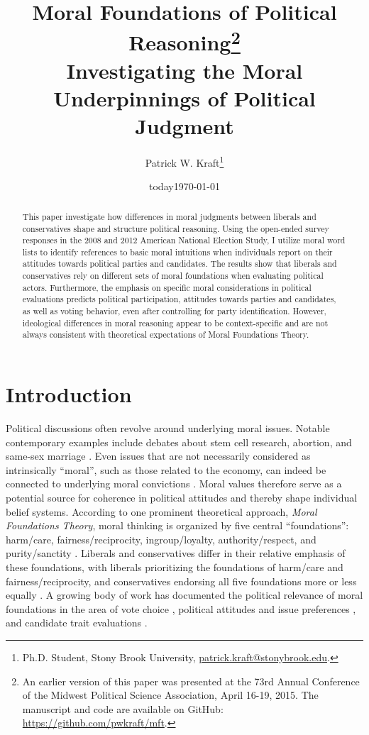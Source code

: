 \documentclass[12pt]{article}
\author{Patrick W. Kraft\footnote{Ph.D. Student, Stony Brook University, \href{mailto:patrick.kraft@stonybrook.edu}{patrick.kraft@stonybrook.edu}.
}}
\date{today}
\title{Moral Foundations of Political Reasoning\footnote{An earlier version of this paper was presented at the 73rd Annual Conference of the Midwest Political Science Association, April 16-19, 2015. The manuscript and code are available on GitHub: \url{https://github.com/pwkraft/mft}.}\\
\large{Investigating the Moral Underpinnings of Political Judgment}}
\date{\today}
\begin{document}
\maketitle
\onehalfspacing

\begin{abstract}
This paper investigate how differences in moral judgments between liberals and conservatives shape and structure political reasoning. Using the open-ended survey responses in the 2008 and 2012 American National Election Study, I utilize moral word lists to identify references to basic moral intuitions when individuals report on their attitudes towards political parties and candidates. The results show that liberals and conservatives rely on different sets of moral foundations when evaluating political actors. Furthermore, the emphasis on specific moral considerations in political evaluations predicts political participation, attitudes towards parties and candidates, as well as voting behavior, even after controlling for party identification. However, ideological differences in moral reasoning appear to be context-specific and are not always consistent with theoretical expectations of Moral Foundations Theory.

\end{abstract}
\newpage


\section{Introduction}

Political discussions often revolve around underlying moral issues. Notable contemporary examples include debates about stem cell research, abortion, and same-sex marriage \citep[e.g.][]{koleva2012tracing,clifford2015concerns}. Even issues that are not necessarily considered as intrinsically ``moral'', such as those related to the economy, can indeed be connected to underlying moral convictions \citep{ryan2014reconsidering}. Moral values therefore serve as a potential source for coherence in political attitudes and thereby shape individual belief systems. According to one prominent theoretical approach, \textit{Moral Foundations Theory}, moral thinking is organized by five central ``foundations'': harm/care, fairness/reciprocity, ingroup/loyalty, authority/respect, and purity/sanctity \citep{haidt2008moral}. Liberals and conservatives differ in their relative emphasis of these foundations, with liberals prioritizing the foundations of harm/care and fairness/reciprocity, and conservatives endorsing all five foundations more or less equally \citep{graham2009liberals}. A growing body of work has documented the political relevance of moral foundations in the area of vote choice \citep{iyer2010beyond, franks2015using}, political attitudes and issue preferences \citep{koleva2012tracing, low2015moral, clifford2015concerns}, and candidate trait evaluations \citep{clifford2014linking}.
\end{document}
